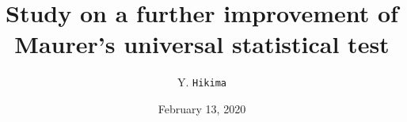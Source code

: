 \documentclass[dvipdfmx,11pt]{beamer}
\title{Study on a further improvement of \\ Maurer's universal statistical test}
\subtitle{}
\date{February 13, 2020}
\author{Y. \texttt{Hikima}}
\institute{\inst{1} 京都大学大学院情報学研究科修士2回}
\begin{document}
\begin{frame}[plain]\frametitle{}
\titlepage %
\end{frame}
\end{document}
